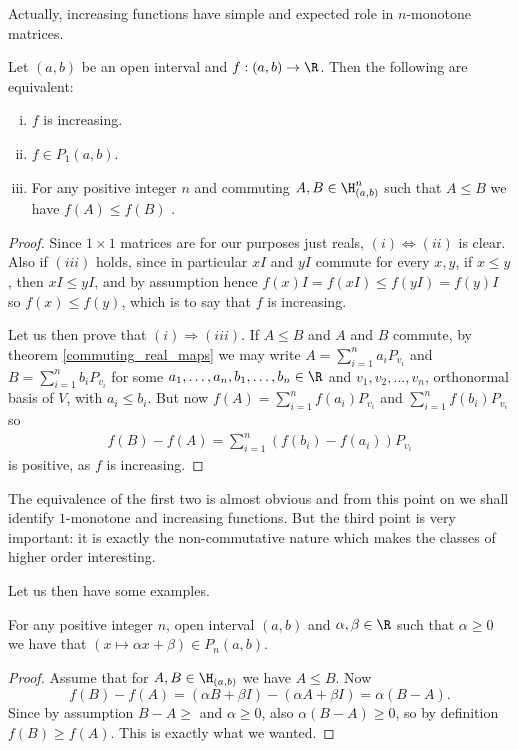 Actually, increasing functions have simple and expected role in $n$-monotone matrices.

\begin{prop}
	Let $(a, b)$ be an open interval and $f : (a, b) \to \R$. Then the following are equivalent:
	\begin{enumerate}[(i)]
		\item $f$ is increasing.
		\item $f \in P_{1}(a, b)$.
		\item For any positive integer $n$ and commuting $A, B \in \H^{n}_{(a, b)}$ such that $A \leq B$ we have $f(A) \leq f(B)$ .
	\end{enumerate}
\end{prop}
\begin{proof}
	Since $1 \times 1$ matrices are for our purposes just reals, $(i) \Leftrightarrow (ii)$ is clear. Also if $(iii)$ holds, since in particular $x I$ and $y I$ commute for every $x, y$, if $x \leq y$, then $x I \leq y I$, and by assumption hence $f(x) I = f(x I) \leq f(y I) = f(y) I$ so $f(x) \leq f(y)$, which is to say that $f$ is increasing.

	Let us then prove that $(i) \Rightarrow (iii)$. If $A \leq B$ and $A$ and $B$ commute, by theorem \ref{commuting_real_maps} we may write $A = \sum_{i = 1}^{n} a_{i} P_{v_{i}}$ and $B = \sum_{i = 1}^{n} b_{i} P_{v_{i}}$ for some $a_{1}, \ldots, a_{n}, b_{1}, \ldots, b_{n} \in \R$ and $v_{1}, v_{2}, \ldots, v_{n}$, orthonormal basis of $V$, with $a_{i} \leq b_{i}$. But now $f(A) = \sum_{i = 1}^{n} f(a_{i}) P_{v_{i}}$ and $\sum_{i = 1}^{n} f(b_{i}) P_{v_{i}}$ so
	\begin{align*}
		f(B) - f(A) = \sum_{i = 1}^{n} (f(b_{i}) - f(a_{i})) P_{v_{i}}
	\end{align*}
	is positive, as $f$ is increasing.
\end{proof}

The equivalence of the first two is almost obvious and from this point on we shall identify $1$-monotone and increasing functions. But the third point is very important: it is exactly the non-commutative nature which makes the classes of higher order interesting.

Let us then have some examples.

\begin{prop}
	For any positive integer $n$, open interval $(a, b)$ and $\alpha, \beta \in \R$ such that $\alpha \geq 0$ we have that $(x \mapsto \alpha x + \beta) \in P_{n}(a, b)$.
\end{prop}
\begin{proof}
	Assume that for $A, B \in \H_{(a, b)}$ we have $A \leq B$. Now
	\[
		f(B) - f(A) = (\alpha B + \beta I) - (\alpha A + \beta I) = \alpha (B - A).
	\]
	Since by assumption $B - A \geq $ and $\alpha \geq 0$, also $\alpha (B - A) \geq 0$, so by definition $f(B) \geq f(A)$. This is exactly what we wanted.
\end{proof}

